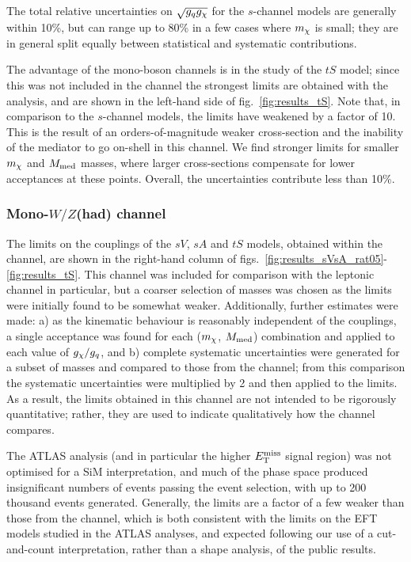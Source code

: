 The total relative uncertainties on $\sqrt{g_q g_{\chi}}$ for the $s$-channel models are generally within 10\%, but can range up to 80\% in a few cases where $m_{\chi}$ is small; they are in general split equally between statistical and systematic contributions.

The advantage of the mono-boson channels is in the study of the $tS$ model; since this was not included in the \monojet channel the strongest limits are obtained with the \monoZ analysis, and are shown in the left-hand side of fig.~\ref{fig:results_tS}. Note that, in comparison to the $s$-channel models, the limits have weakened by a factor of 10. This is the result of an orders-of-magnitude weaker cross-section and the inability of the mediator to go on-shell in this channel. We find stronger limits for smaller $m_{\chi}$ and $M_{\mathrm{med}}$ masses, where larger cross-sections compensate for lower acceptances at these points. Overall, the uncertainties contribute less than 10\%.

\subsubsection{Mono-$W/Z$(had) channel}

The limits on the couplings of the $sV$, $sA$ and $tS$ models, obtained within the \monoWZ channel, are shown in the right-hand column of figs.~\ref{fig:results_sVsA_rat05}-\ref{fig:results_tS}. This channel was included for comparison with the leptonic \monoZ channel in particular, but a coarser selection of masses was chosen as the limits were initially found to be somewhat weaker. Additionally, further estimates were made: a) as the kinematic behaviour is reasonably independent of the couplings, a single acceptance was found for each ($m_{\chi}$, $M_{\mathrm{med}}$) combination and applied to each value of $g_{\chi} / g_q$, and b) complete systematic uncertainties were generated for a subset of masses and compared to those from the \monoZ channel; from this comparison the \monoZ systematic uncertainties were multiplied by 2 and then applied to the \monoWZ limits. As a result, the limits obtained in this channel are not intended to be rigorously quantitative; rather, they are used to indicate qualitatively how the channel compares.

The ATLAS \monoWZ analysis (and in particular the higher $E_{\mathrm{T}}^{\mathrm{miss}}$ signal region) was not optimised for a SiM interpretation, and much of the phase space produced insignificant numbers of events passing the event selection, with up to 200 thousand events generated. Generally, the limits are a factor of a few weaker than those from the \monoZ channel, which is both consistent with the limits on the EFT models studied in the ATLAS analyses, and expected following our use of a cut-and-count interpretation, rather than a shape analysis, of the \monoWZ public results.

